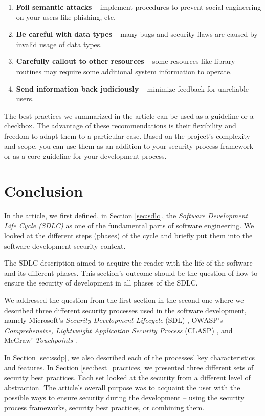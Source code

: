 \documentclass[12pt,a4,twoside]{article}
\begin{document}
\begin{enumerate}
    \item \textbf{Foil semantic attacks} -- implement procedures to prevent social engineering on your users like phishing, etc.
    \item \textbf{Be careful with data types} -- many bugs and security flaws are caused by invalid usage of data types.
    \item \textbf{Carefully callout to other resources} -- some resources like library routines may require some additional system information to operate.
    \item \textbf{Send information back judiciously} -- minimize feedback for unreliable users.
\end{enumerate}

The best practices we summarized in the article can be used as a guideline or a checkbox. The advantage of these recommendations is their flexibility and freedom to adapt them to a particular case. Based on the project's complexity and scope, you can use them as an addition to your security process framework or as a core guideline for your development process.

\newpage

\section*{Conclusion}

In the article, we first defined, in Section \ref{sec:sdlc}, the \textit{Software Development Life Cycle (SDLC)} as one of the fundamental parts of software engineering. We looked at the different steps (phases) of the cycle and briefly put them into the software development security context.

The SDLC description aimed to acquire the reader with the life of the software and its different phases. This section's outcome should be the question of how to ensure the security of development in all phases of the SDLC.

We addressed the question from the first section in the second one where we described three different security processes used in the software development, namely Microsoft's \textit{Security Development Lifecycle} (SDL) \cite{microsoft_sdl}, OWASP’s \textit{Comprehensive, Lightweight Application Security Process} (CLASP) \cite{owasp}, and McGraw' \textit{Touchpoints} \cite{mcgraw2004software}.

In Section \ref{sec:ssdp}, we also described each of the processes' key characteristics and features. In Section \ref{sec:best_practices} we presented three different sets of security best practices. Each set looked at the security from a different level of abstraction. The article's overall purpose was to acquaint the user with the possible ways to ensure security during the development -- using the security process frameworks, security best practices, or combining them.

\newpage
\printbibliography
{}
\end{document}
